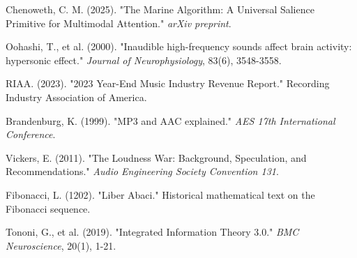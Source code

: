 \documentclass[12pt,a4paper]{article}
\begin{document}
\begin{thebibliography}{99}

Chenoweth, C. M. (2025). "The Marine Algorithm: A Universal Salience Primitive for Multimodal Attention." \textit{arXiv preprint}.

Oohashi, T., et al. (2000). "Inaudible high-frequency sounds affect brain activity: hypersonic effect." \textit{Journal of Neurophysiology}, 83(6), 3548-3558.

RIAA. (2023). "2023 Year-End Music Industry Revenue Report." Recording Industry Association of America.

Brandenburg, K. (1999). "MP3 and AAC explained." \textit{AES 17th International Conference}.

Vickers, E. (2011). "The Loudness War: Background, Speculation, and Recommendations." \textit{Audio Engineering Society Convention 131}.

Fibonacci, L. (1202). "Liber Abaci." Historical mathematical text on the Fibonacci sequence.

Tononi, G., et al. (2019). "Integrated Information Theory 3.0." \textit{BMC Neuroscience}, 20(1), 1-21.

\end{thebibliography}
\end{document}
